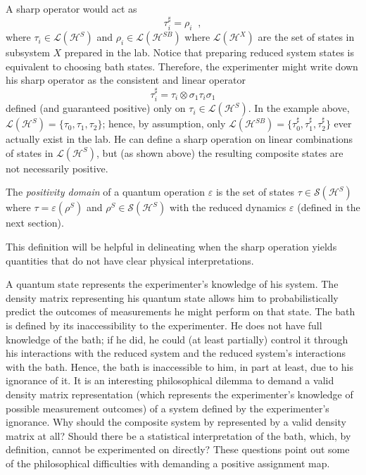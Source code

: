 A sharp operator would act as
$$
\tau_i^\sharp = \rho_i\;\;,
$$
where $\tau_i\in\mathcal{L}(\mathcal{H}^S)$ and $\rho_i\in\mathcal{L}(\mathcal{H}^{SB})$ where $\mathcal{L}(\mathcal{H}^X)$ are the set of states in subsystem $X$ prepared in the lab.  Notice that preparing reduced system states is equivalent to choosing bath states.  Therefore, the experimenter might write down his sharp operator as the consistent and linear operator
$$
\tau_i^\sharp = \tau_i \otimes \sigma_1\tau_i\sigma_1
$$
defined (and guaranteed positive) only on $\tau_i\in\mathcal{L}(\mathcal{H}^S)$.  In the example above, $\mathcal{L}(\mathcal{H}^S) = \{\tau_0,\tau_1,\tau_2\}$; hence, by assumption, only $\mathcal{L}(\mathcal{H}^{SB}) = \{\tau_0^\sharp,\tau_1^\sharp,\tau_2^\sharp\}$ ever actually exist in the lab.  He can define a sharp operation on linear combinations of states in $\mathcal{L}(\mathcal{H}^S)$, but (as shown above) the resulting composite states are not necessarily positive. 

\begin{definition}
The {\em positivity domain} of a quantum operation $\varepsilon$ is the set of states $\tau\in\mathcal{S}(\mathcal{H}^S)$ where $\tau=\varepsilon(\rho^S)$ and $\rho^S \in\mathcal{S}(\mathcal{H}^S)$ with the reduced dynamics $\varepsilon$ (defined in the next section).
\end{definition} 
This definition will be helpful in delineating when the sharp operation yields quantities that do not have clear physical interpretations. 

A quantum state represents the experimenter's knowledge of his system.  The density matrix representing his quantum state allows him to probabilistically predict the outcomes of measurements he might perform on that state.  The bath is defined by its inaccessibility to the experimenter.  He does not have full knowledge of the bath; if he did, he could (at least partially) control it through his interactions with the reduced system and the reduced system's interactions with the bath.  Hence, the bath is inaccessible to him, in part at least, due to his ignorance of it.  It is an interesting philosophical dilemma to demand a valid density matrix representation (which represents the experimenter's knowledge of possible measurement outcomes) of a system defined by the experimenter's ignorance.  Why should the composite system by represented by a valid density matrix at all?  Should there be a statistical interpretation of the bath, which, by definition, cannot be experimented on directly?  These questions point out some of the philosophical difficulties with demanding a positive assignment map.

